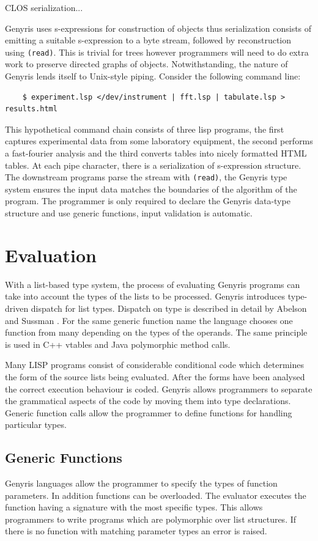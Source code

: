 \documentclass[a4paper,12pt,dvips]{article}
\begin{document}
CLOS serialization... 

Genyris uses s-expressions for construction of objects thus serialization consists of emitting a suitable s-expression to a byte stream, followed by reconstruction using \texttt{(read)}. This is trivial for trees however programmers will need to do extra work to preserve directed graphs of objects. Notwithstanding, the nature of Genyris lends itself to Unix-style piping. Consider the following command line:

\begin{verbatim}
	$ experiment.lsp </dev/instrument | fft.lsp | tabulate.lsp > results.html
\end{verbatim}

This hypothetical command chain consists of three lisp programs, the first captures experimental data from some laboratory equipment, the second performs a fast-fourier analysis and the third converts tables into nicely formatted HTML tables. At each pipe character, there is a serialization of s-expression structure. The downstream programs parse the stream with \texttt{(read)}, the Genyris type system ensures the input data matches the boundaries of the algorithm of the program. The programmer is only required to declare the Genyris data-type structure and use generic functions, input validation is automatic.  


\section{Evaluation}
With a list-based type system, the process of evaluating Genyris programs can take into account the types of the lists to be processed. Genyris introduces type-driven dispatch for list types. Dispatch on type is described in detail by Abelson and Sussman \cite{SICP}. For the same generic function name the language chooses one function from many depending on the types of the operands. The same principle is used in C++ vtables and Java polymorphic method calls.    

Many LISP programs consist of considerable conditional code which determines the form of the source lists being evaluated. After the forms have been analysed the correct execution behaviour is coded. Genyris allows programmers to separate the grammatical aspects of the code by moving them into type declarations. Generic function calls allow the programmer to define functions for handling particular types. 

\subsection{Generic Functions}
Genyris languages allow the programmer to specify the types of function parameters. In addition functions can be overloaded. The evaluator executes the function having a signature with the most specific types. This allows programmers to write programs which are polymorphic over list structures. If there is no function with matching parameter types an error is raised.
\end{document}

